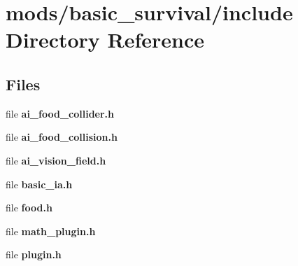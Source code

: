 \section{mods/basic\+\_\+survival/include Directory Reference}
\label{dir_001ed853b903e5ea2f3f12bf6ab36e0d}
\subsection*{Files}
\begin{DoxyCompactItemize}
\item 
file {\bfseries ai\+\_\+food\+\_\+collider.\+h}
\item 
file {\bfseries ai\+\_\+food\+\_\+collision.\+h}
\item 
file {\bfseries ai\+\_\+vision\+\_\+field.\+h}
\item 
file {\bfseries basic\+\_\+ia.\+h}
\item 
file {\bfseries food.\+h}
\item 
file {\bfseries math\+\_\+plugin.\+h}
\item 
file {\bfseries plugin.\+h}
\end{DoxyCompactItemize}
